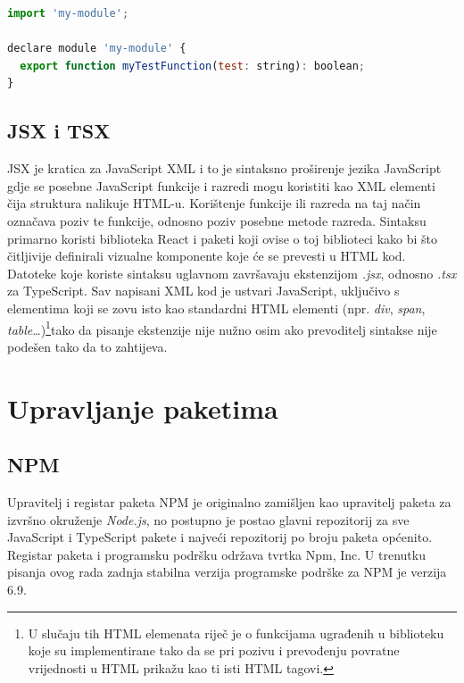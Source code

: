 \documentclass[times, utf8, diplomski, numeric]{fer}
\newcommand{\razmakp}{\vspace{18pt}}
\newcommand{\razmaks}{\vspace{10pt}}
\begin{document}
\razmakp %
\begin{lstlisting}[language=JavaScript, caption={Primjer deklaracijske datoteke}, label={lst:declaration_file}]
import 'my-module';

declare module 'my-module' {
  export function myTestFunction(test: string): boolean;
}
\end{lstlisting}
\razmaks


\subsection{JSX i TSX}

JSX je kratica za JavaScript XML i to je sintaksno proširenje jezika JavaScript gdje se posebne JavaScript funkcije i razredi mogu koristiti kao XML elementi čija struktura nalikuje HTML-u\citep{jsx_spec}.
Korištenje funkcije ili razreda na taj način označava poziv te funkcije, odnosno poziv posebne metode razreda. Sintaksu primarno koristi biblioteka React i paketi koji ovise o toj biblioteci kako bi što čitljivije definirali vizualne komponente koje će se prevesti u HTML kod\citep{react_docs}.
Datoteke koje koriste sintaksu uglavnom završavaju ekstenzijom \emph{.jsx}, odnosno \emph{.tsx} za TypeScript\citep{ts_hand}.
Sav napisani XML kod je ustvari JavaScript, uključivo s elementima koji se zovu isto kao standardni HTML elementi (npr. \emph{div}, \emph{span}, \emph{table}…)\footnote{
    U slučaju tih HTML elemenata riječ je o funkcijama ugrađenih u biblioteku koje su implementirane tako da se pri pozivu i prevođenju povratne vrijednosti u HTML prikažu kao ti isti HTML tagovi.
}tako da pisanje ekstenzije nije nužno osim ako prevoditelj sintakse nije podešen tako da to zahtijeva.


\newpage
\section{Upravljanje paketima}

\subsection{NPM}

Upravitelj i registar paketa NPM je originalno zamišljen kao upravitelj paketa za izvršno okruženje \emph{Node.js}, no postupno je postao glavni repozitorij za sve JavaScript i TypeScript pakete i najveći repozitorij po broju paketa općenito\citep{med_npm_stats}.
Registar paketa i programsku podršku održava tvrtka Npm, Inc.
U trenutku pisanja ovog rada zadnja stabilna verzija programske podrške za NPM je verzija 6.9\citep{wiki_npm}.
\end{document}
